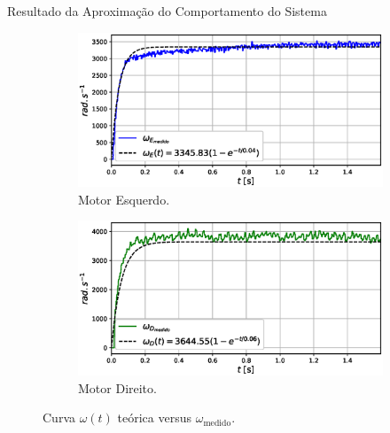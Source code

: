 \begin{frame}{Resultado da Aproximação do Comportamento do Sistema}


\begin{figure}
    \begin{subfigure}{.48\textwidth}
        \centering
        \includegraphics[width=1.15\textwidth]{figuras/resultados/exp04/regressao_vs_medido_esquerdo100.eps}
        \caption{Motor Esquerdo.}
    \end{subfigure}
    \begin{subfigure}{.48\textwidth}
        \centering
        \includegraphics[width=1.15\textwidth]{figuras/resultados/exp04/regressao_vs_medido_direito100.eps}
        \caption{Motor Direito.}
    \end{subfigure}
    \caption{Curva $\omega(t)$ teórica versus $\omega_{\text{medido}}$.}
\end{figure}
    
\end{frame}


